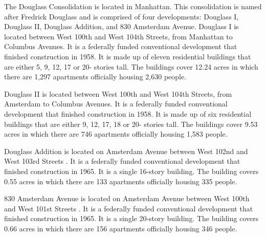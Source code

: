 The Douglass Consolidation is located in Manhattan. This consolidation is named after Fredrick Douglass and is comprised of four developments: Douglass I, Douglass II, Douglass Addition, and 830 Amsterdam Avenue. Douglass I is located between West 100th and West 104th Streets, from Manhattan to Columbus Avenues. It is a federally funded conventional development that finished construction in 1958. It is made up of eleven residential buildings that are either 5, 9, 12, 17 or 20- stories tall. The buildings cover 12.24 acres in which there are 1,297 apartments officially housing 2,630 people.     \par \vspace{.7\baselineskip}Douglass II is located between West 100th and West 104th Streets, from Amsterdam to Columbus Avenues. It is a federally funded conventional development that finished construction in 1958. It is made up of six residential buildings that are either 9, 12, 17, 18 or 20- stories tall. The buildings cover 9.53 acres in which there are 746 apartments officially housing 1,583 people.     \par \vspace{.7\baselineskip}    \par \vspace{.7\baselineskip}Douglass Addition is located on Amsterdam Avenue between West 102nd and West 103rd Streets . It is a federally funded conventional development that finished construction in 1965. It is a single 16-story building. The building covers 0.55 acres in which there are 133 apartments officially housing 335 people.     \par \vspace{.7\baselineskip} \par \vspace{.7\baselineskip}830 Amsterdam Avenue is located on Amsterdam Avenue between West 100th and West 101st Streets . It is a federally funded conventional development that finished construction in 1965. It is a single 20-story building. The building covers 0.66 acres in which there are 156 apartments officially housing 346 people.